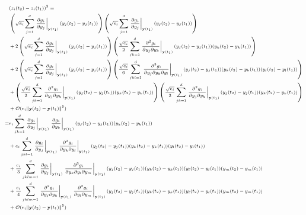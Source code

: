 \begin{equation}
\scriptsize
\begin{aligned}
& (z_i(t_2) - z_i(t_1))^2 = \\ 
& \left( \sqrt{e_i} \sum_{j=1}^d \left. \frac{\partial g_i}{\partial y_j} \right|_{\mathbf{y}(t_1)} (y_j(t_2)-y_j(t_1)) \right) \left( \sqrt{e_i} \sum_{j=1}^d \left. \frac{\partial g_i}{\partial y_j} \right|_{\mathbf{y}(t_1)} (y_j(t_2)-y_j(t_1)) \right) \\
&+ 2 \left( \sqrt{e_i} \sum_{j=1}^d \left. \frac{\partial g_i}{\partial y_j} \right|_{\mathbf{y}(t_1)} (y_j(t_2)-y_j(t_1)) \right) \left( \frac{\sqrt{e_i}}{2} \sum_{jk=1}^d \left. \frac{\partial^2 g_i}{\partial y_j \partial y_k} \right|_{\mathbf{y}(t_1)} (y_j(t_2)-y_j(t_1)) (y_k(t_2)-y_k(t_1)) \right) \\
&+ 2 \left( \sqrt{e_i} \sum_{j=1}^d \left. \frac{\partial g_i}{\partial y_j} \right|_{\mathbf{y}(t_1)} (y_j(t_2)-y_j(t_1)) \right) \left( \frac{\sqrt{e_i}}{6} \sum_{jkl=1}^d \left. \frac{\partial^3 g_i}{\partial y_j \partial y_k \partial y_l} \right|_{\mathbf{y}(t_1)} (y_j(t_2)-y_j(t_1)) (y_k(t_2)-y_k(t_1)) (y_l(t_2)-y_l(t_1)) \right) \\
&+ \left( \frac{\sqrt{e_i}}{2} \sum_{jk=1}^d \left. \frac{\partial^2 g_i}{\partial y_j \partial y_k} \right|_{\mathbf{y}(t_1)} (y_j(t_2)-y_j(t_1)) (y_k(t_2)-y_k(t_1)) \right) \left( \frac{\sqrt{e_i}}{2} \sum_{jk=1}^d \left. \frac{\partial^2 g_i}{\partial y_j \partial y_k} \right|_{\mathbf{y}(t_1)} (y_j(t_2)-y_j(t_1)) (y_k(t_2)-y_k(t_1)) \right) \\
&+ \mathcal{O}( e_i \|\mathbf{y}(t_2) - \mathbf{y}(t_1) \|^5) \\
=& e_i \sum_{jk=1}^d \left. \frac{\partial g_i}{\partial y_j} \right|_{\mathbf{y}(t_1)} \left. \frac{\partial g_i}{\partial y_k} \right|_{\mathbf{y}(t_1)} (y_j(t_2)-y_j(t_1)) (y_k(t_2)-y_k(t_1)) \\
&+ e_i \sum_{jkl=1}^d \left. \frac{\partial g_i}{\partial y_j} \right|_{\mathbf{y}(t_1)} \left. \frac{\partial^2 g_i}{\partial y_k \partial y_l} \right|_{\mathbf{y}(t_1)} (y_j(t_2)-y_j(t_1))  (y_k(t_2)-y_k(t_1)) (y_l(t_2)-y_l(t_1)) \\
&+ \frac{e_i}{3} \sum_{jklm=1}^d \left. \frac{\partial g_i}{\partial y_j} \right|_{\mathbf{y}(t_1)} \left. \frac{\partial^3 g_i}{ \partial y_k \partial y_l \partial y_m} \right|_{\mathbf{y}(t_1)} (y_j(t_2)-y_j(t_1)) (y_k(t_2)-y_k(t_1)) (y_l(t_2)-y_l(t_1))(y_m(t_2)-y_m(t_1)) \\
&+ \frac{e_i}{4} \sum_{jklm=1}^d \left. \frac{\partial^2 g_i}{\partial y_j \partial y_k} \right|_{\mathbf{y}(t_1)} \left. \frac{\partial^2 g_i}{\partial y_l \partial y_m} \right|_{\mathbf{y}(t_1)} (y_j(t_2)-y_j(t_1)) (y_k(t_2)-y_k(t_1)) (y_l(t_2)-y_l(t_1)) (y_m(t_2)-y_m(t_1)) \\
&+ \mathcal{O}(e_i \|\mathbf{y}(t_2) - \mathbf{y}(t_1) \|^5)
\end{aligned}
\end{equation}
